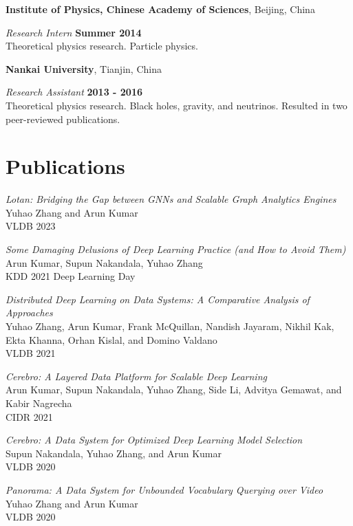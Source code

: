 \documentclass[margin,line]{res}
\begin{document}
\begin{resume}
{\bf Institute of Physics, Chinese Academy of Sciences}, Beijing, China

\vspace{-.3cm}
{\em Research Intern} \hfill {\bf Summer 2014}\\
Theoretical physics research. Particle physics.

{\bf Nankai University}, Tianjin, China

\vspace{-.3cm}
{\em Research Assistant} \hfill {\bf 2013 - 2016}\\
Theoretical physics research. Black holes, gravity, and neutrinos. Resulted in two peer-reviewed publications.



\section{\sc Publications}
\textit{Lotan: Bridging the Gap between GNNs and Scalable Graph Analytics Engines}\\
Yuhao Zhang and Arun Kumar\\
VLDB 2023


\textit{Some Damaging Delusions of Deep Learning Practice (and How to Avoid Them)}\\
Arun Kumar, Supun Nakandala, Yuhao Zhang\\
KDD 2021 Deep Learning Day

\textit{Distributed Deep Learning on Data Systems: A Comparative Analysis of Approaches}\\
Yuhao Zhang, Arun Kumar, Frank McQuillan, Nandish Jayaram, Nikhil Kak, Ekta Khanna, Orhan Kislal, and Domino Valdano\\
VLDB 2021

\textit{Cerebro: A Layered Data Platform for Scalable Deep Learning}\\
Arun Kumar, Supun Nakandala, Yuhao Zhang, Side Li, Advitya Gemawat, and Kabir Nagrecha\\
CIDR 2021

\textit{Cerebro: A Data System for Optimized Deep Learning Model Selection}\\
Supun Nakandala, Yuhao Zhang, and Arun Kumar\\
VLDB 2020

\textit{Panorama: A Data System for Unbounded Vocabulary Querying over Video}\\
Yuhao Zhang and Arun Kumar\\
VLDB 2020


\end{resume}
\end{document}
